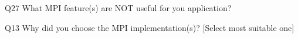 \begin{description}%
\item{Q27} What MPI feature(s) are NOT useful for you application?%
\item{Q13} Why did you choose the MPI implementation(s)? [Select most suitable one]%
\end{description}%
